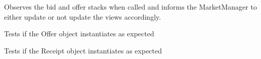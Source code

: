 \begin{DoxyRefList}
\item[\label{todo__todo000032}%
\hypertarget{todo__todo000032}{}%
Member \hyperlink{class_matching_engine_unit_test_a914f15f54087d84798e02b33734a9791}{Matching\+Engine\+Unit\+Test.update\+Test} ()]Observes the bid and offer stacks when called and informs the Market\+Manager to either update or not update the views accordingly.  
\item[\label{todo__todo000033}%
\hypertarget{todo__todo000033}{}%
Member \hyperlink{class_offer_unit_test_a6a183dfb778383f20231c0dd4a43dc65}{Offer\+Unit\+Test.instantiation} ()]Tests if the Offer object instantiates as expected  
\item[\label{todo__todo000034}%
\hypertarget{todo__todo000034}{}%
Member \hyperlink{class_receipt_unit_test_aab92fcc0a866db8ec56ed65b9693cdc8}{Receipt\+Unit\+Test.instantiation} ()]Tests if the Receipt object instantiates as expected 
\end{DoxyRefList}